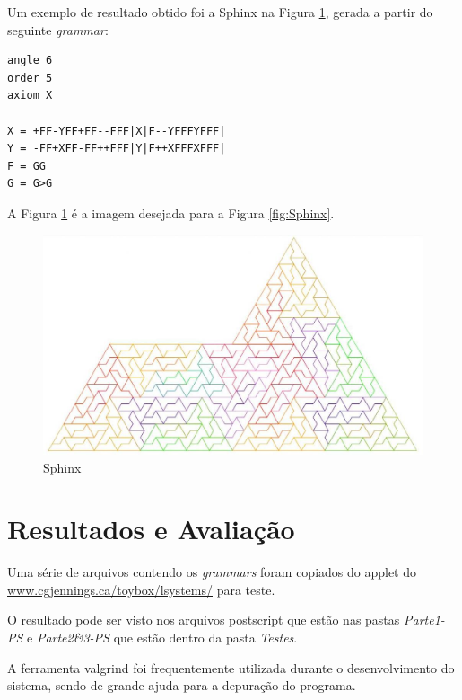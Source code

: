 \documentclass[a4paper,12pt]{article}%
\begin{document}
Um exemplo de resultado obtido foi a Sphinx na Figura \ref{fig:Sphinx2}, 
gerada a partir do seguinte \emph{grammar}:
\begin{verbatim}
angle 6
order 5
axiom X

X = +FF-YFF+FF--FFF|X|F--YFFFYFFF|
Y = -FF+XFF-FF++FFF|Y|F++XFFFXFFF|
F = GG
G = G>G
\end{verbatim} 
\hspace{1.5em}A Figura \ref{fig:Sphinx2} é a imagem desejada para a Figura \ref{fig:Sphinx}.
\newline 
\begin{figure}[ht!]
\centering
\includegraphics[width=140mm]{sphinx2.jpg}
\caption{Sphinx}
\label{fig:Sphinx2} 
\end{figure}

\newpage
\section{Resultados e Avaliação}
\hspace{1.5em}Uma série de arquivos contendo os \emph{grammars} foram copiados do applet do \url{www.cgjennings.ca/toybox/lsystems/} para teste.

O resultado pode ser visto nos arquivos postscript que estão nas pastas \emph{Parte1-PS} e \emph{Parte2\&3-PS} que estão dentro da pasta 
\emph{Testes}.

A ferramenta valgrind foi frequentemente utilizada durante o desenvolvimento do sistema, 
sendo de grande ajuda para a depuração do programa.


\end{document}

